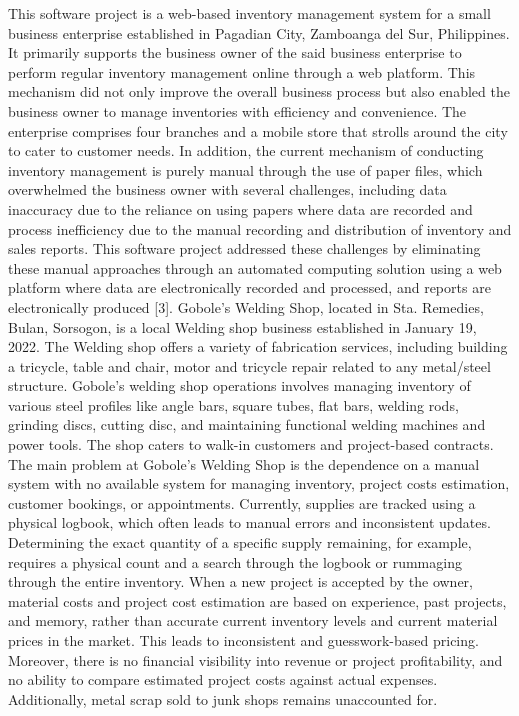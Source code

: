 \documentclass[12pt, letterpaper]{article}
\begin{document}
\newpage
\hspace*{2em} This software project is a web-based inventory management system for a small business enterprise established in Pagadian City, Zamboanga del Sur, Philippines. It primarily supports the business owner of the said business enterprise to perform regular inventory management online through a web platform. This mechanism did not only improve the overall business process but also enabled the business owner to manage inventories with efficiency and convenience. The enterprise comprises four branches and a mobile store that strolls around the city to cater to customer needs. In addition, the current mechanism of conducting inventory management is purely manual through the use of paper files, which overwhelmed the business owner with several challenges, including data inaccuracy due to the reliance on using papers where data are recorded and process inefficiency due to the manual recording and distribution of inventory and sales reports. This software project addressed these challenges by eliminating these manual approaches through an automated computing solution using a web platform where data are electronically recorded and processed, and reports are electronically produced [3].
\hspace*{2em} Gobole's Welding Shop, located in Sta. Remedies, Bulan, Sorsogon, is a local Welding shop business established in January 19, 2022. The Welding shop offers a variety of fabrication services, including building a tricycle, table and chair, motor and tricycle repair related to any metal/steel structure. Gobole's welding shop operations involves managing inventory of various steel profiles like angle bars, square tubes, flat bars, welding rods, grinding discs, cutting disc, and maintaining functional welding machines and power tools. The shop caters to walk-in customers and project-based contracts.
\hspace*{2em} The main problem at Gobole’s Welding Shop is the dependence on a manual system with no available system for managing inventory, project costs estimation, customer bookings, or appointments. Currently, supplies are tracked using a physical logbook, which often leads to manual errors and inconsistent updates. Determining the exact quantity of a specific supply remaining, for example, requires a physical count and a search through the logbook or rummaging through the entire inventory.
\hspace*{2em} When a new project is accepted by the owner, material costs and project cost estimation are based on experience, past projects, and memory, rather than accurate current inventory levels and current material prices in the market. This leads to inconsistent and guesswork-based pricing. Moreover, there is no financial visibility into revenue or project profitability, and no ability to compare estimated project costs against actual expenses. Additionally, metal scrap sold to junk shops remains unaccounted for.
\end{document}
